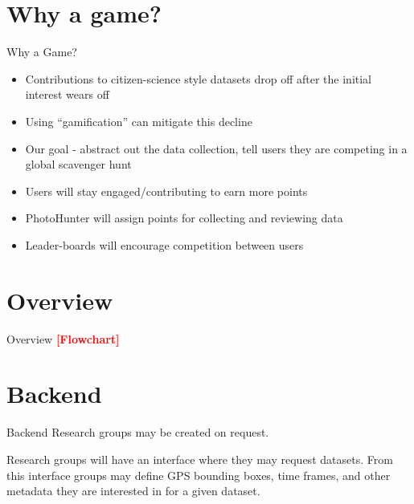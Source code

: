 \documentclass[aspectratio=169]{beamer}
\newcommand{\todo}[1]{\textcolor{red}{\textbf{[#1]}}}
\begin{document}
\section{Why a game?}

\begin{frame}{Why a Game?}
  \begin{itemize}
    
    \item Contributions to citizen-science style datasets drop off after
          the initial interest wears off
  
    \item Using ``gamification'' can mitigate this decline
  
    \item Our goal - abstract out the data collection, tell users they
          are competing in a global scavenger hunt

    \item Users will stay engaged/contributing to earn more points

    \item PhotoHunter will assign points for collecting and reviewing data

    \item Leader-boards will encourage competition between users

  \end{itemize}
\end{frame}

\section{Overview}

\begin{frame}{Overview}
  \todo{Flowchart}
\end{frame}

\section{Backend}

\begin{frame}{Backend}
  Research groups may be created on request. 

  Research groups will have an interface where they may request
  datasets. From this interface groups may define GPS bounding boxes,
  time frames, and other metadata they are interested in for a given
  dataset.
\end{frame}
\end{document}
